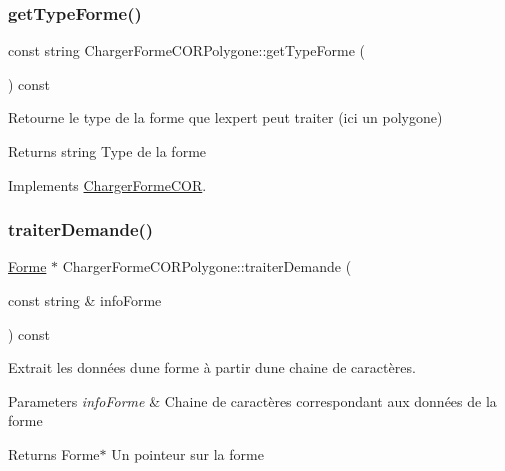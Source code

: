 \subsubsection{\texorpdfstring{get\+Type\+Forme()}{getTypeForme()}}
{\footnotesize\ttfamily const string Charger\+Forme\+C\+O\+R\+Polygone\+::get\+Type\+Forme (\begin{DoxyParamCaption}{ }\end{DoxyParamCaption}) const\hspace{0.3cm}{\ttfamily [virtual]}}



Retourne le type de la forme que l\textquotesingle{}expert peut traiter (ici un polygone) 

\begin{DoxyReturn}{Returns}
string Type de la forme 
\end{DoxyReturn}


Implements \hyperlink{class_charger_forme_c_o_r_ae740eabcd9b3cc3809c1fe5ffd0100a1}{Charger\+Forme\+C\+OR}.

\mbox{\label{class_charger_forme_c_o_r_polygone_a4ce89ecdaa400d4930743a8e7204b5f2}} 
\subsubsection{\texorpdfstring{traiter\+Demande()}{traiterDemande()}}
{\footnotesize\ttfamily \hyperlink{class_forme}{Forme} $\ast$ Charger\+Forme\+C\+O\+R\+Polygone\+::traiter\+Demande (\begin{DoxyParamCaption}\item[{const string \&}]{info\+Forme }\end{DoxyParamCaption}) const\hspace{0.3cm}{\ttfamily [virtual]}}



Extrait les données d\textquotesingle{}une forme à partir d\textquotesingle{}une chaine de caractères. 


\begin{DoxyParams}{Parameters}
{\em info\+Forme} & Chaine de caractères correspondant aux données de la forme \\
\hline
\end{DoxyParams}
\begin{DoxyReturn}{Returns}
Forme$\ast$ Un pointeur sur la forme 
\end{DoxyReturn}


